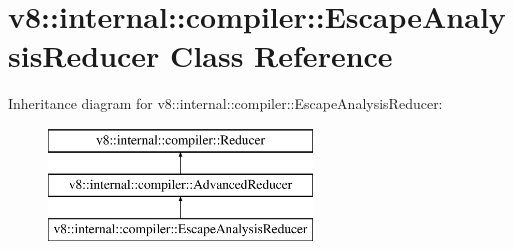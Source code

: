 \hypertarget{classv8_1_1internal_1_1compiler_1_1_escape_analysis_reducer}{}\section{v8\+:\+:internal\+:\+:compiler\+:\+:Escape\+Analysis\+Reducer Class Reference}
\label{classv8_1_1internal_1_1compiler_1_1_escape_analysis_reducer}
Inheritance diagram for v8\+:\+:internal\+:\+:compiler\+:\+:Escape\+Analysis\+Reducer\+:\begin{figure}[H]
\begin{center}
\leavevmode
\includegraphics[height=3.000000cm]{classv8_1_1internal_1_1compiler_1_1_escape_analysis_reducer}
\end{center}
\end{figure}
